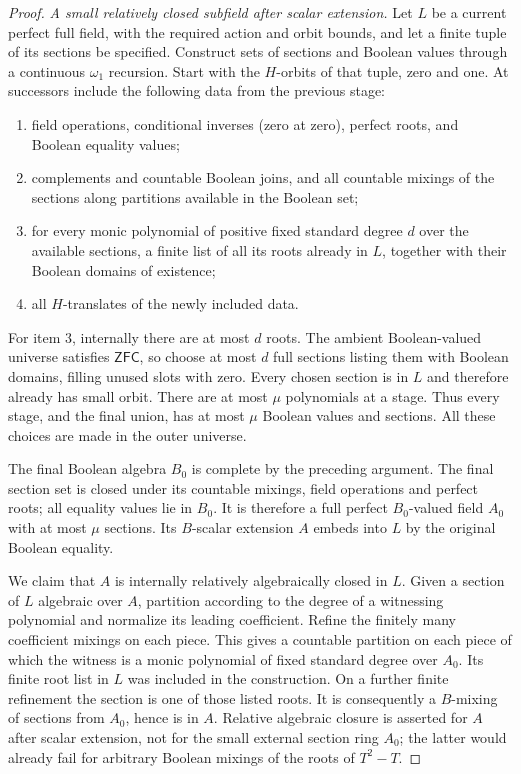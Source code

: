 \documentclass[11pt,a4paper]{article}
\theoremstyle{definition}\newtheorem{definition}[theorem]{Definition}
\theoremstyle{remark}\newtheorem{remark}[theorem]{Remark}
\begin{document}
\begin{proof}
\emph{A small relatively closed subfield after scalar extension.} Let $L$ be a current perfect full field, with the required action and orbit bounds, and let a finite tuple of its sections be specified. Construct sets of sections and Boolean values through a continuous $\omega_1$ recursion. Start with the $H$-orbits of that tuple, zero and one. At successors include the following data from the previous stage:
\begin{enumerate}
\item field operations, conditional inverses (zero at zero), perfect roots, and Boolean equality values;
\item complements and countable Boolean joins, and all countable mixings of the sections along partitions available in the Boolean set;
\item for every monic polynomial of positive fixed standard degree $d$ over the available sections, a finite list of all its roots already in $L$, together with their Boolean domains of existence;
\item all $H$-translates of the newly included data.
\end{enumerate}
For item 3, internally there are at most $d$ roots. The ambient Boolean-valued universe satisfies $\mathsf{ZFC}$, so choose at most $d$ full sections listing them with Boolean domains, filling unused slots with zero. Every chosen section is in $L$ and therefore already has small orbit. There are at most $\mu$ polynomials at a stage. Thus every stage, and the final union, has at most $\mu$ Boolean values and sections. All these choices are made in the outer universe.

The final Boolean algebra $B_0$ is complete by the preceding argument. The final section set is closed under its countable mixings, field operations and perfect roots; all equality values lie in $B_0$. It is therefore a full perfect $B_0$-valued field $A_0$ with at most $\mu$ sections. Its $B$-scalar extension $A$ embeds into $L$ by the original Boolean equality.

We claim that $A$ is internally relatively algebraically closed in $L$. Given a section of $L$ algebraic over $A$, partition according to the degree of a witnessing polynomial and normalize its leading coefficient. Refine the finitely many coefficient mixings on each piece. This gives a countable partition on each piece of which the witness is a monic polynomial of fixed standard degree over $A_0$. Its finite root list in $L$ was included in the construction. On a further finite refinement the section is one of those listed roots. It is consequently a $B$-mixing of sections from $A_0$, hence is in $A$. Relative algebraic closure is asserted for $A$ after scalar extension, not for the small external section ring $A_0$; the latter would already fail for arbitrary Boolean mixings of the roots of $T^2-T$.


\end{proof}
\end{document}
